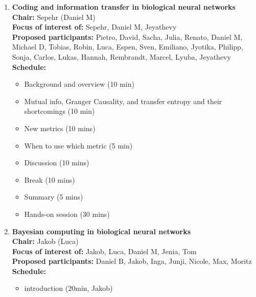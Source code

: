 \documentclass[10pt, a4paper,twoside,american]{article}
\begin{document}
\begin{enumerate}[resume]
\item {\large\bf Coding and information transfer in biological neural networks}\\[1ex]
  {\bf Chair:} Sepehr (Daniel M)\\[1ex]
  {\bf Focus of interest of:} Sepehr, Daniel M, Jeyathevy\\[1ex]
  {\bf Proposed participants:} Pietro, David, Sacha, Julia, Renato, Daniel M, Michael D, Tobias, Robin, Luca, Espen, Sven, Emiliano, Jyotika, Philipp, Sonja, Carlos, Lukas, Hannah, Rembrandt, Marcel, Lyuba, Jeyathevy\\[1ex]
  {\bf Schedule:} 
  \begin{itemize}
  \item Background and overview (10 min)
  \item Mutual info, Granger Causality, and transfer entropy and their shortcomings (10 min)
  \item New metrics (10 mins)
  \item When to use which metric (5 min)
  \item Discussion (10 mins)
  \item Break (10 mins)
  \item Summary  (5 mins)
  \item Hands-on session (30 mins)
  \end{itemize}
\item {\large\bf Bayesian computing in biological neural networks}\\[1ex]
  {\bf Chair:} Jakob (Luca)\\[1ex]
  {\bf Focus of interest of:} Jakob, Luca, Daniel M, Jenia, Tom\\[1ex]
  {\bf Proposed participants:} Daniel B, Jakob, Inga, Junji, Nicole, Max, Moritz\\[1ex]
  {\bf Schedule:}
  \begin{itemize}
  \item introduction (20min, Jakob)

\end{itemize}
\end{enumerate}
\end{document}
